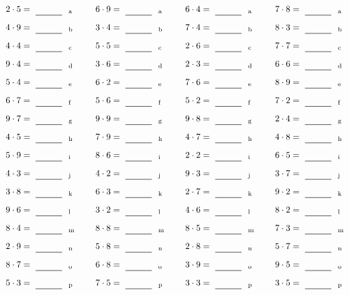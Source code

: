 \documentclass
[
  draft    = true,
  fontsize = 11pt,
  parskip  = half-
]
{scrartcl}
\begin{document}
\par\vfill\par
\begin{align*}
    \pline{2\cdot5}&=\rline{a}
  & \pline{6\cdot9}&=\rline{a}
  & \pline{6\cdot4}&=\rline{a}
  & \pline{7\cdot8}&=\rline{a} \\[1ex]
    \pline{4\cdot9}&=\rline{b}
  & \pline{3\cdot4}&=\rline{b}
  & \pline{7\cdot4}&=\rline{b}
  & \pline{8\cdot3}&=\rline{b} \\[1ex]
    \pline{4\cdot4}&=\rline{c}
  & \pline{5\cdot5}&=\rline{c}
  & \pline{2\cdot6}&=\rline{c}
  & \pline{7\cdot7}&=\rline{c} \\[1ex]
    \pline{9\cdot4}&=\rline{d}
  & \pline{3\cdot6}&=\rline{d}
  & \pline{2\cdot3}&=\rline{d}
  & \pline{6\cdot6}&=\rline{d} \\[1ex]
    \pline{5\cdot4}&=\rline{e}
  & \pline{6\cdot2}&=\rline{e}
  & \pline{7\cdot6}&=\rline{e}
  & \pline{8\cdot9}&=\rline{e} \\[1ex]
    \pline{6\cdot7}&=\rline{f}
  & \pline{5\cdot6}&=\rline{f}
  & \pline{5\cdot2}&=\rline{f}
  & \pline{7\cdot2}&=\rline{f} \\[1ex]
    \pline{9\cdot7}&=\rline{g}
  & \pline{9\cdot9}&=\rline{g}
  & \pline{9\cdot8}&=\rline{g}
  & \pline{2\cdot4}&=\rline{g} \\[1ex]
    \pline{4\cdot5}&=\rline{h}
  & \pline{7\cdot9}&=\rline{h}
  & \pline{4\cdot7}&=\rline{h}
  & \pline{4\cdot8}&=\rline{h} \\[1ex]
    \pline{5\cdot9}&=\rline{i}
  & \pline{8\cdot6}&=\rline{i}
  & \pline{2\cdot2}&=\rline{i}
  & \pline{6\cdot5}&=\rline{i} \\[1ex]
    \pline{4\cdot3}&=\rline{j}
  & \pline{4\cdot2}&=\rline{j}
  & \pline{9\cdot3}&=\rline{j}
  & \pline{3\cdot7}&=\rline{j} \\[1ex]
    \pline{3\cdot8}&=\rline{k}
  & \pline{6\cdot3}&=\rline{k}
  & \pline{2\cdot7}&=\rline{k}
  & \pline{9\cdot2}&=\rline{k} \\[1ex]
    \pline{9\cdot6}&=\rline{l}
  & \pline{3\cdot2}&=\rline{l}
  & \pline{4\cdot6}&=\rline{l}
  & \pline{8\cdot2}&=\rline{l} \\[1ex]
    \pline{8\cdot4}&=\rline{m}
  & \pline{8\cdot8}&=\rline{m}
  & \pline{8\cdot5}&=\rline{m}
  & \pline{7\cdot3}&=\rline{m} \\[1ex]
    \pline{2\cdot9}&=\rline{n}
  & \pline{5\cdot8}&=\rline{n}
  & \pline{2\cdot8}&=\rline{n}
  & \pline{5\cdot7}&=\rline{n} \\[1ex]
    \pline{8\cdot7}&=\rline{o}
  & \pline{6\cdot8}&=\rline{o}
  & \pline{3\cdot9}&=\rline{o}
  & \pline{9\cdot5}&=\rline{o} \\[1ex]
    \pline{5\cdot3}&=\rline{p}
  & \pline{7\cdot5}&=\rline{p}
  & \pline{3\cdot3}&=\rline{p}
  & \pline{3\cdot5}&=\rline{p}
\end{align*}
\end{document}
